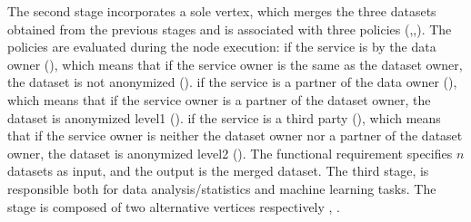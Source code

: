 The second stage incorporates a sole vertex, which merges the three datasets obtained from the previous stages and is associated with three policies (,,).
The policies are evaluated during the node execution:
if the service is by the data owner (\pone), which means that if the service owner is the same as the dataset owner, the dataset is not anonymized ().
if the service is a partner of the data owner (\ptwo), which means that if the service owner is a partner of the dataset owner, the dataset is anonymized level1 ().
if the service is a third party (\pthree), which means that if the service owner is neither the dataset owner nor a partner of the dataset owner, the dataset is anonymized level2 ().
The functional requirement specifies $n$ datasets as input, and the output is the merged dataset.
The third stage, is responsible both for data analysis/statistics and machine learning tasks.
The stage is composed of two alternative vertices respectively , .

